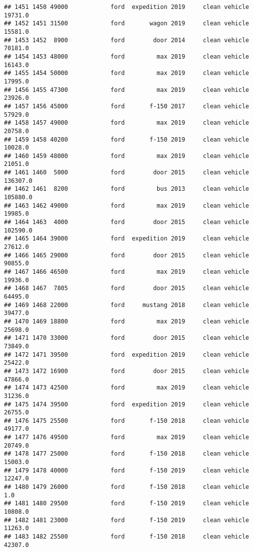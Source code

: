 \documentclass[
]{article}
\begin{document}
\begin{verbatim}
## 1451 1450 49000            ford  expedition 2019     clean vehicle   19731.0
## 1452 1451 31500            ford       wagon 2019     clean vehicle   15581.0
## 1453 1452  8900            ford        door 2014     clean vehicle   70181.0
## 1454 1453 48000            ford         max 2019     clean vehicle   16143.0
## 1455 1454 50000            ford         max 2019     clean vehicle   17995.0
## 1456 1455 47300            ford         max 2019     clean vehicle   23926.0
## 1457 1456 45000            ford       f-150 2017     clean vehicle   57929.0
## 1458 1457 49000            ford         max 2019     clean vehicle   20758.0
## 1459 1458 40200            ford       f-150 2019     clean vehicle   10028.0
## 1460 1459 48000            ford         max 2019     clean vehicle   21051.0
## 1461 1460  5000            ford        door 2015     clean vehicle  136307.0
## 1462 1461  8200            ford         bus 2013     clean vehicle  105880.0
## 1463 1462 49000            ford         max 2019     clean vehicle   19985.0
## 1464 1463  4000            ford        door 2015     clean vehicle  102590.0
## 1465 1464 39000            ford  expedition 2019     clean vehicle   27612.0
## 1466 1465 29000            ford        door 2015     clean vehicle   90855.0
## 1467 1466 46500            ford         max 2019     clean vehicle   19936.0
## 1468 1467  7805            ford        door 2015     clean vehicle   64495.0
## 1469 1468 22000            ford     mustang 2018     clean vehicle   39477.0
## 1470 1469 18800            ford         max 2019     clean vehicle   25698.0
## 1471 1470 33000            ford        door 2015     clean vehicle   73849.0
## 1472 1471 39500            ford  expedition 2019     clean vehicle   25422.0
## 1473 1472 16900            ford        door 2015     clean vehicle   47866.0
## 1474 1473 42500            ford         max 2019     clean vehicle   31236.0
## 1475 1474 39500            ford  expedition 2019     clean vehicle   26755.0
## 1476 1475 25500            ford       f-150 2018     clean vehicle   49177.0
## 1477 1476 49500            ford         max 2019     clean vehicle   20749.0
## 1478 1477 25000            ford       f-150 2018     clean vehicle   15003.0
## 1479 1478 40000            ford       f-150 2019     clean vehicle   12247.0
## 1480 1479 26000            ford       f-150 2018     clean vehicle       1.0
## 1481 1480 29500            ford       f-150 2019     clean vehicle   10808.0
## 1482 1481 23000            ford       f-150 2019     clean vehicle   11263.0
## 1483 1482 25500            ford       f-150 2018     clean vehicle   42307.0

\end{verbatim}
\end{document}
